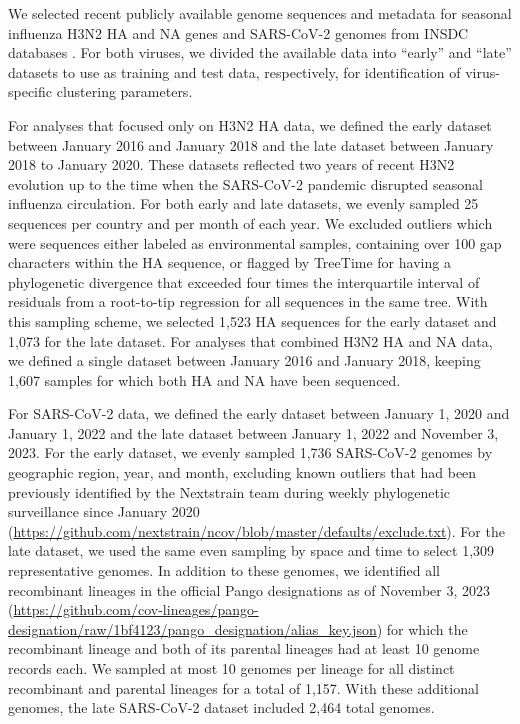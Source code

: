 \documentclass[webpdf,contemporary,large,single]{oup-authoring-template}%
\theoremstyle{thmstyleone}%
\theoremstyle{thmstyletwo}%
\theoremstyle{thmstylethree}%
\begin{document}
We selected recent publicly available genome sequences and metadata for seasonal influenza H3N2 HA and NA genes and SARS-CoV-2 genomes from INSDC databases \citep{Arita2021}.
For both viruses, we divided the available data into ``early'' and ``late'' datasets to use as training and test data, respectively, for identification of virus-specific clustering parameters.

For analyses that focused only on H3N2 HA data, we defined the early dataset between January 2016 and January 2018 and the late dataset between January 2018 to January 2020.
These datasets reflected two years of recent H3N2 evolution up to the time when the SARS-CoV-2 pandemic disrupted seasonal influenza circulation.
For both early and late datasets, we evenly sampled 25 sequences per country and per month of each year.
We excluded outliers which were sequences either labeled as environmental samples, containing over 100 gap characters within the HA sequence, or flagged by TreeTime \citep{Sagulenko2018} for having a phylogenetic divergence that exceeded four times the interquartile interval of residuals from a root-to-tip regression for all sequences in the same tree.
With this sampling scheme, we selected 1,523 HA sequences for the early dataset and 1,073 for the late dataset.
For analyses that combined H3N2 HA and NA data, we defined a single dataset between January 2016 and January 2018, keeping 1,607 samples for which both HA and NA have been sequenced.

For SARS-CoV-2 data, we defined the early dataset between January 1, 2020 and January 1, 2022 and the late dataset between January 1, 2022 and November 3, 2023.
For the early dataset, we evenly sampled 1,736 SARS-CoV-2 genomes by geographic region, year, and month, excluding known outliers that had been previously identified by the Nextstrain team during weekly phylogenetic surveillance since January 2020 (\url{https://github.com/nextstrain/ncov/blob/master/defaults/exclude.txt}).
For the late dataset, we used the same even sampling by space and time to select 1,309 representative genomes.
In addition to these genomes, we identified all recombinant lineages in the official Pango designations as of November 3, 2023 (\url{https://github.com/cov-lineages/pango-designation/raw/1bf4123/pango_designation/alias_key.json}) for which the recombinant lineage and both of its parental lineages had at least 10 genome records each.
We sampled at most 10 genomes per lineage for all distinct recombinant and parental lineages for a total of 1,157.
With these additional genomes, the late SARS-CoV-2 dataset included 2,464 total genomes.
\end{document}
